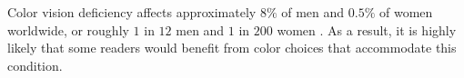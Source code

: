 


\noindent Color vision deficiency affects approximately $8\%$ of men and $0.5\%$ of women worldwide, or roughly $1$ in $12$ men and $1$ in $200$ women .
As a result, it is highly likely that some readers would benefit from color choices that accommodate this condition.
